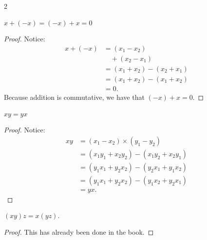 \begin{multicols}{2}
\begin{proposition}
	$x + (-x) = (-x) + x = 0$
\end{proposition}
\begin{proof}
	Notice:
		\begin{align*}
		x + (-x) &= (x_1 \minus x_2) \\
		&\quad + (x_2 \minus x_1) \\
		&= (x_1 + x_2) \minus (x_2 + x_1) \\
		&= (x_1 + x_2) \minus (x_1 + x_2) \\
		&= 0.
		\end{align*}
Because addition is commutative, we have that $(-x) + x = 0.$
\end{proof}

\begin{proposition}
	$xy = yx$
\end{proposition}
\begin{proof}
	Notice:
	\begin{align*}
		xy &= (x_1 \minus x_2) \times (y_1 \minus y_2) \\
		&= (x_1 y_1 + x_2 y_2) \minus (x_1 y_2 + x_2 y_1) \\
		&= (y_1 x_1 + y_2 x_2) \minus (y_2 x_1 + y_1 x_2) \\
		&= (y_1 x_1 + y_2 x_2) \minus (y_1 x_2 + y_2 x_1) \\
		&= yx.
	\end{align*}
\end{proof}

\begin{proposition}
	$(xy)z = x(yz)$.
\end{proposition}
\begin{proof}
	This has already been done in the book.
\end{proof}


\end{multicols}
